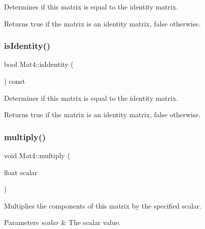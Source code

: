Determines if this matrix is equal to the identity matrix.

\begin{DoxyReturn}{Returns}
true if the matrix is an identity matrix, false otherwise. 
\end{DoxyReturn}
\mbox{\label{classMat4_a3309850f850ef88e57e3b9b17af3371e}} 
\subsubsection{\texorpdfstring{is\+Identity()}{isIdentity()}\hspace{0.1cm}{\footnotesize\ttfamily [2/2]}}
{\footnotesize\ttfamily bool Mat4\+::is\+Identity (\begin{DoxyParamCaption}{ }\end{DoxyParamCaption}) const}

Determines if this matrix is equal to the identity matrix.

\begin{DoxyReturn}{Returns}
true if the matrix is an identity matrix, false otherwise. 
\end{DoxyReturn}
\mbox{\label{classMat4_a45bc83fe1011e2c02f3d0ed9ae9081c4}} 
\subsubsection{\texorpdfstring{multiply()}{multiply()}\hspace{0.1cm}{\footnotesize\ttfamily [1/10]}}
{\footnotesize\ttfamily void Mat4\+::multiply (\begin{DoxyParamCaption}\item[{float}]{scalar }\end{DoxyParamCaption})}

Multiplies the components of this matrix by the specified scalar.


\begin{DoxyParams}{Parameters}
{\em scalar} & The scalar value. \\
\hline
\end{DoxyParams}
\mbox{\label{classMat4_a45bc83fe1011e2c02f3d0ed9ae9081c4}} 
